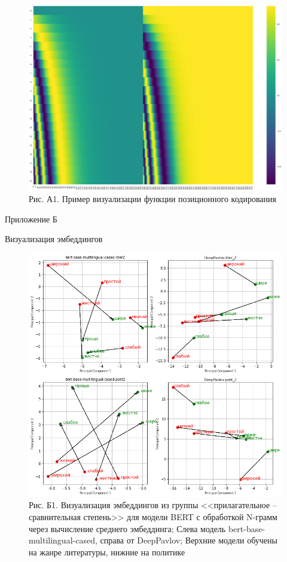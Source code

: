 \documentclass[a4paper,14pt]{article}
\begin{document}
\begin{figure}[H]
	\centering
	\includegraphics[width=0.95\linewidth]{image/v9dvohtljexbjop_vrykyyqdzbk}
	\caption*{Рис. А1. Пример визуализации функции позиционного кодирования}
	\label{fig:v9dvohtljexbjopvrykyyqdzbk}
\end{figure}

\newpage


\begin{flushright}
	Приложение Б
\end{flushright}

\begin{center}
	Визуализация эмбеддингов
\end{center}


\begin{figure}[H]
	\centering
	\includegraphics[width=0.95\linewidth]{image/pril_2}
	\caption*{Рис. Б1. Визуализация эмбеддингов из группы <<прилагательное -- сравнительная степень>> для модели BERT с обработкой N-грамм через вычисление среднего эмбеддинга; Слева модель bert-base-multilingual-cased, справа от DeepPavlov; Верхние модели обучены на жанре литературы, нижние на политике}
	\label{fig:pril22}
\end{figure}
\end{document}
